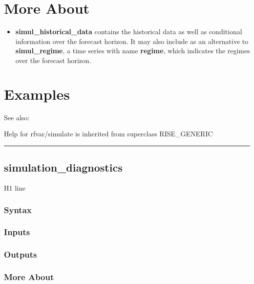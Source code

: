 \documentclass[letterpaper,10pt,english]{sphinxmanual}
\begin{document}
\section{More About}
\label{classes/models/@rfvar/rfvar:id119}\begin{itemize}
\item {} 
\textbf{simul\_historical\_data} contains the historical data as well as
conditional information over the forecast horizon. It may also include
as an alternative to \textbf{simul\_regime}, a time series with name
\textbf{regime}, which indicates the regimes over the forecast horizon.

\end{itemize}


\section{Examples}
\label{classes/models/@rfvar/rfvar:id120}
See also:

Help for rfvar/simulate is inherited from superclass RISE\_GENERIC


\bigskip\hrule{}\bigskip



\subsection{simulation\_diagnostics}
\label{classes/models/@rfvar/rfvar:simulation-diagnostics}\label{classes/models/@rfvar/rfvar:id121}
H1 line


\subsubsection{Syntax}
\label{classes/models/@rfvar/rfvar:id122}

\subsubsection{Inputs}
\label{classes/models/@rfvar/rfvar:id123}

\subsubsection{Outputs}
\label{classes/models/@rfvar/rfvar:id124}

\subsubsection{More About}
\label{classes/models/@rfvar/rfvar:id125}
\end{document}
